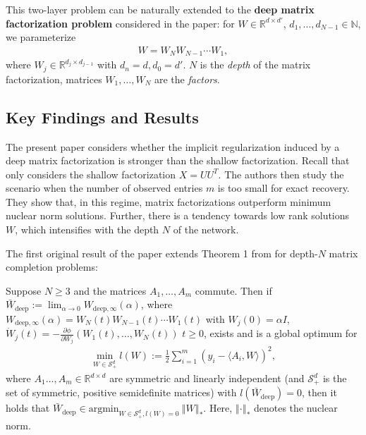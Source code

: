 \documentclass{article}
\newenvironment{manualtheorem}[1]{%
  \renewcommand\themanualtheoreminner{#1}%
  \manualtheoreminner
}{\endmanualtheoreminner}
\begin{document}
This two-layer problem can be naturally extended to the \textbf{deep matrix factorization problem} considered in the paper: for $W \in \mathbb{R}^{d \times d'}$, $d_1, \ldots, d_{N-1} \in \mathbb{N}$, we parameterize
\begin{align*}
    W = W_N W_{N-1} \cdots W_1,
\end{align*}
where $W_j \in \mathbb{R}^{d_j \times d_{j-1}}$ with $d_n = d, d_0 = d'$. $N$ is the \textit{depth} of the matrix factorization, matrices $W_1, \ldots, W_N$ are the \textit{factors}.

\subsection{Key Findings and Results}
The present paper considers whether the implicit regularization induced by a deep matrix factorization is stronger than the shallow factorization. Recall that \cite{gunasekar2018implicit} only considers the shallow factorization $X = UU^T$. The authors then study the scenario when the number of observed entries $m$ is too small for exact recovery. They show that, in this regime, matrix factorizations outperform minimum nuclear norm solutions. Further, there is a tendency towards low rank solutions $W$, which intensifies with the depth $N$ of the network. 

The first original result of the paper extends Theorem 1 from \cite{gunasekar2018implicit} for depth-$N$ matrix completion problems:
\begin{manualtheorem}{2}
Suppose $N \geq 3$ and the matrices $A_1, \ldots, A_m$ commute. Then if $\bar{W}_{\text{deep}} := \lim_{\alpha \rightarrow 0} W_{\text{deep}, \infty}(\alpha)$, where $ W_{\text{deep}, \infty}(\alpha) = W_N(t) W_{N-1}(t) \cdots W_1(t)$ with $W_j(0) = \alpha I$, $\dot{W}_j(t) = -\frac{\partial \phi}{\partial W_j}(W_1(t), \ldots, W_N(t))$ $t \geq 0$, exists and is a global optimum for
\begin{align*}
    \min_{W \in \mathcal{S}_+^d} l(W) := \frac{1}{2} \sum_{i=1}^m (y_i - \langle A_i, W \rangle)^2,
\end{align*}
where $A_1 \ldots, A_m \in \mathbb{R}^{d \times d}$ are symmetric and linearly independent (and $\mathcal{S}_+^d$ is the set of symmetric, positive semidefinite matrices) with $l(\bar{W}_{\text{deep}}) = 0$, then it holds that $\bar{W}_{\text{deep}} \in \text{argmin}_{W \in \mathcal{S}_+^d, l(W) = 0} \ \left\Vert W \right\Vert_*.$ Here, $\left\Vert \cdot \right\Vert_*$ denotes the nuclear norm.
\end{manualtheorem}
\end{document}
